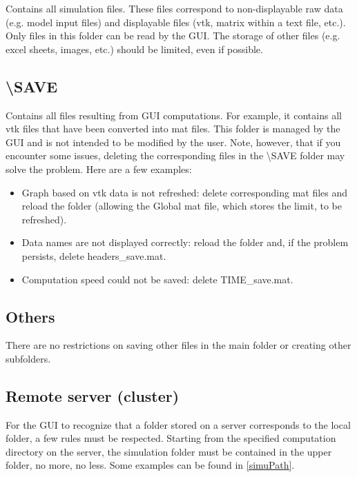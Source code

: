 \documentclass{article}
\begin{document}
Contains all simulation files. These files correspond to non-displayable raw data (e.g. model input files) and displayable files (vtk, matrix within a text file, etc.). Only files in this folder can be read by the GUI. The storage of other files (e.g. excel sheets, images, etc.) should be limited, even if possible.

\subsection{\textbackslash SAVE}

Contains all files resulting from GUI computations. For example, it contains all vtk files that have been converted into mat files. This folder is managed by the GUI and is not intended to be modified by the user. Note, however, that if you encounter some issues, deleting the corresponding files in the \textbackslash SAVE folder may solve the problem. Here are a few examples:

\begin{itemize}
    \item Graph based on vtk data is not refreshed: delete corresponding mat files and reload the folder (allowing the Global mat file, which stores the limit, to be refreshed).
    \item Data names are not displayed correctly: reload the folder and, if the problem persists, delete headers\_save.mat. 
    \item Computation speed could not be saved: delete TIME\_save.mat.
\end{itemize}

\subsection{Others}

There are no restrictions on saving other files in the main folder or creating other subfolders.

\subsection{Remote server (cluster)}

For the GUI to recognize that a folder stored on a server corresponds to the local folder, a few rules must be respected. Starting from the specified computation directory on the server, the simulation folder must be contained in the upper folder, no more, no less. Some examples can be found in \cref{simuPath}.
\end{document}
